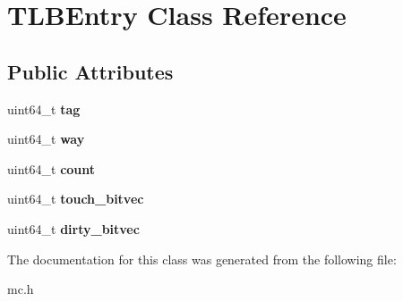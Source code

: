 \hypertarget{classTLBEntry}{\section{T\-L\-B\-Entry Class Reference}
\label{classTLBEntry}
}
\subsection*{Public Attributes}
\begin{DoxyCompactItemize}
\item 
\hypertarget{classTLBEntry_addc58d8f000123d0b5693a51caa62509}{uint64\-\_\-t {\bfseries tag}}\label{classTLBEntry_addc58d8f000123d0b5693a51caa62509}

\item 
\hypertarget{classTLBEntry_a9b196922ff9c2886e52a6dfe4d8ec876}{uint64\-\_\-t {\bfseries way}}\label{classTLBEntry_a9b196922ff9c2886e52a6dfe4d8ec876}

\item 
\hypertarget{classTLBEntry_a432ed03adae97f95f3d42ee9921ff14f}{uint64\-\_\-t {\bfseries count}}\label{classTLBEntry_a432ed03adae97f95f3d42ee9921ff14f}

\item 
\hypertarget{classTLBEntry_ab7adb7c24c46d8dd997b33e4998b9494}{uint64\-\_\-t {\bfseries touch\-\_\-bitvec}}\label{classTLBEntry_ab7adb7c24c46d8dd997b33e4998b9494}

\item 
\hypertarget{classTLBEntry_a22752207750153856dff57a434dddda6}{uint64\-\_\-t {\bfseries dirty\-\_\-bitvec}}\label{classTLBEntry_a22752207750153856dff57a434dddda6}

\end{DoxyCompactItemize}


The documentation for this class was generated from the following file\-:\begin{DoxyCompactItemize}
\item 
mc.\-h\end{DoxyCompactItemize}

